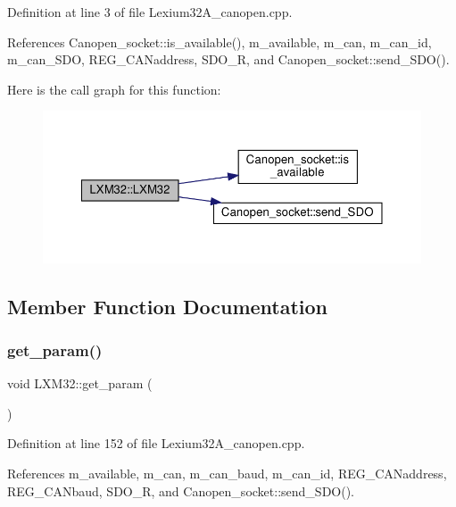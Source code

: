 Definition at line 3 of file Lexium32\+A\+\_\+canopen.\+cpp.



References Canopen\+\_\+socket\+::is\+\_\+available(), m\+\_\+available, m\+\_\+can, m\+\_\+can\+\_\+id, m\+\_\+can\+\_\+\+S\+DO, R\+E\+G\+\_\+\+C\+A\+Naddress, S\+D\+O\+\_\+R, and Canopen\+\_\+socket\+::send\+\_\+\+S\+D\+O().

Here is the call graph for this function\+:\nopagebreak
\begin{figure}[H]
\begin{center}
\leavevmode
\includegraphics[width=350pt]{class_l_x_m32_aa4a3e84b72c79b4d47e9f842a8977f98_cgraph}
\end{center}
\end{figure}


\subsection{Member Function Documentation}
\mbox{\label{class_l_x_m32_aa36cd9154a11f3388715fa2f482c37ca}} 
\subsubsection{\texorpdfstring{get\+\_\+param()}{get\_param()}}
{\footnotesize\ttfamily void L\+X\+M32\+::get\+\_\+param (\begin{DoxyParamCaption}{ }\end{DoxyParamCaption})}



Definition at line 152 of file Lexium32\+A\+\_\+canopen.\+cpp.



References m\+\_\+available, m\+\_\+can, m\+\_\+can\+\_\+baud, m\+\_\+can\+\_\+id, R\+E\+G\+\_\+\+C\+A\+Naddress, R\+E\+G\+\_\+\+C\+A\+Nbaud, S\+D\+O\+\_\+R, and Canopen\+\_\+socket\+::send\+\_\+\+S\+D\+O().



